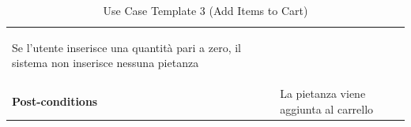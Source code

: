 \documentclass{article}
\begin{document}
\begin{table}
\begin{tabularx}{\textwidth}{|lX|}
\begin{description}[nosep,before=\leavevmode\vspace*{-1\baselineskip},after=\leavevmode\vspace*{-1\baselineskip}]
                                                                        \item [4b.] Se l'utente inserisce una quantità pari a zero, il sistema non inserisce nessuna pietanza
                                                                    \end{description} \\
                    \rowcolor{white} \textbf{Post-conditions} & La pietanza viene aggiunta al carrello \\
                    \toprule
                \end{tabularx}
                \caption{Use Case Template 3 (Add Items to Cart)}
                \label{tab:use-case-template-3}
            \end{table}
\end{document}
